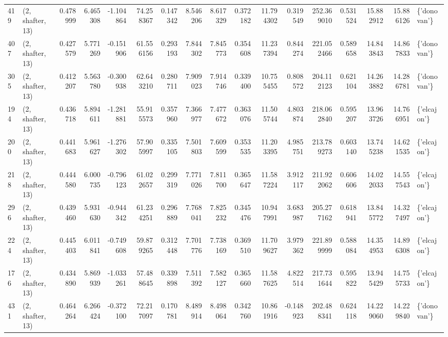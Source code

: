 \begin{tabular}{llrrrrrrrrrrrrrrl}
419 &  (2, shafter, 13) &   0.478999 &   6.465308 &  -1.104864 &    74.258367 &   0.147342 &   8.546206 &   8.617329 &  0.372182 &  11.794302 &   0.319549 &   252.369010 &   0.531524 &  15.882912 &  15.886126 &  \{'donovan'\} \\
407 &  (2, shafter, 13) &   0.427579 &   5.771269 &  -0.151906 &    61.556156 &   0.293193 &   7.844302 &   7.845773 &  0.354608 &  11.237394 &   0.844274 &   221.052466 &   0.589658 &  14.843843 &  14.867833 &  \{'donovan'\} \\
305 &  (2, shafter, 13) &   0.412207 &   5.563780 &  -0.300938 &    62.643210 &   0.280711 &   7.909023 &   7.914746 &  0.339400 &  10.755455 &   0.808572 &   204.112123 &   0.621104 &  14.263882 &  14.286781 &  \{'donovan'\} \\
194 &  (2, shafter, 13) &   0.436718 &   5.894611 &  -1.281881 &    55.915573 &   0.357960 &   7.366977 &   7.477672 &  0.363076 &  11.505744 &   4.803874 &   218.062840 &   0.595207 &  13.963726 &  14.766951 &  \{'elcajon'\} \\
200 &  (2, shafter, 13) &   0.441683 &   5.961627 &  -1.276302 &    57.905997 &   0.335105 &   7.501803 &   7.609599 &  0.353535 &  11.203395 &   4.985751 &   213.789273 &   0.603140 &  13.745238 &  14.621535 &  \{'elcajon'\} \\
218 &  (2, shafter, 13) &   0.444580 &   6.000735 &  -0.796123 &    61.022657 &   0.299319 &   7.771026 &   7.811700 &  0.365647 &  11.587224 &   3.912117 &   211.922062 &   0.606606 &  14.022033 &  14.557543 &  \{'elcajon'\} \\
296 &  (2, shafter, 13) &   0.439460 &   5.931630 &  -0.944342 &    61.234251 &   0.296889 &   7.768041 &   7.825232 &  0.345476 &  10.947991 &   3.683987 &   205.277162 &   0.618941 &  13.845772 &  14.327497 &  \{'elcajon'\} \\
224 &  (2, shafter, 13) &   0.445403 &   6.011841 &  -0.749608 &    59.879265 &   0.312448 &   7.701776 &   7.738169 &  0.369510 &  11.709627 &   3.979362 &   221.899999 &   0.588084 &  14.354953 &  14.896308 &  \{'elcajon'\} \\
176 &  (2, shafter, 13) &   0.434890 &   5.869939 &  -1.033261 &    57.488645 &   0.339898 &   7.511392 &   7.582127 &  0.365660 &  11.587625 &   4.822514 &   217.731644 &   0.595822 &  13.945429 &  14.755733 &  \{'elcajon'\} \\
431 &  (2, shafter, 13) &   0.464264 &   6.266424 &  -0.372100 &    72.217097 &   0.170781 &   8.489914 &   8.498064 &  0.342760 &  10.861916 &  -0.148923 &   202.488341 &   0.624118 &  14.229060 &  14.229840 &  \{'donovan'\} \\

\end{tabular}
